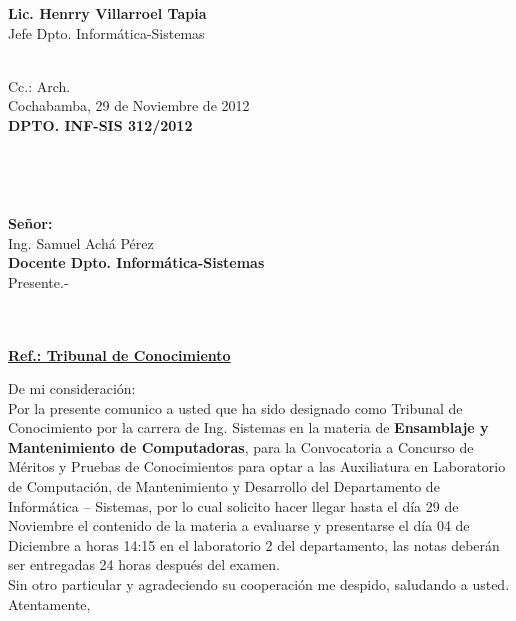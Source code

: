\documentclass[letterpaper,11pt]{letter}
\begin{document}
\vspace{3.5cm}
\begin{center}
\begin{minipage}[b]{0.5\textwidth}
\begin{center}
{\bf Lic. Henrry Villarroel Tapia}\\
Jefe Dpto. Informática-Sistemas\\
\end{center}
\end{minipage}
\end{center}
~\\
Cc.: Arch.\\
\newpage
Cochabamba, 29 de Noviembre de 2012~\\
 \textbf{DPTO. INF-SIS 312/2012}\\
~\\
~\\
~\\
~\\
 \textbf{Señor:}~\\
Ing. Samuel Achá Pérez~\\
 \textbf{Docente Dpto. Informática-Sistemas}~\\
Presente.-\\
~\\
~\\
\begin{center}
\underline{ \textbf{Ref.: Tribunal de Conocimiento}}
\end{center}
De mi consideración:\\
Por la presente comunico a usted que ha sido designado como Tribunal de Conocimiento por la carrera de Ing. Sistemas en la materia de \textbf{Ensamblaje y Mantenimiento de Computadoras}, para la Convocatoria a Concurso de Méritos y Pruebas de Conocimientos para optar a las Auxiliatura en Laboratorio de Computación, de Mantenimiento y Desarrollo del Departamento de Informática – Sistemas, por lo cual solicito hacer llegar hasta el día 29 de Noviembre el contenido de la materia a evaluarse y presentarse el día 04 de Diciembre a horas 14:15 en el laboratorio 2 del departamento, las notas deberán ser entregadas 24 horas después del examen.\\
Sin otro particular y agradeciendo su cooperación me despido, saludando a usted.\\
Atentamente,\\
\end{document}
